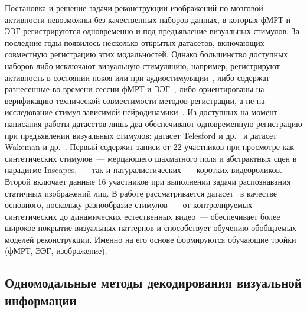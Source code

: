 Постановка и решение задачи реконструкции изображений по мозговой активности невозможны без качественных наборов данных, в которых фМРТ и ЭЭГ регистрируются одновременно и под предъявление визуальных стимулов. За последние годы появилось несколько открытых датасетов, включающих совместную регистрацию этих модальностей. Однако большинство доступных наборов либо исключают визуальную стимуляцию, например, регистрируют активность в состоянии покоя или при аудиостимуляции~\cite{Gu2023, Momenian2024}, либо содержат разнесенные во времени сессии фМРТ и ЭЭГ~\cite{Berezutskaya2022}, либо ориентированы на верификацию технической совместимости методов регистрации, а не на исследование стимул-зависимой нейродинамики~\cite{GallegoRudolf2023}. Из доступных на момент написания работы датасетов лишь два обеспечивают одновременную регистрацию при предъявлении визуальных стимулов: датасет Telesford и др.~\cite{Telesford2023} и датасет Wakeman и др.~\cite{Wakeman2015}. Первый содержит записи от 22 участников при просмотре как синтетических стимулов~--- мерцающего шахматного поля и абстрактных сцен в парадигме Inscapes,~--- так и натуралистических~--- коротких видеороликов. Второй включает данные 16 участников при выполнении задачи распознавания статичных изображений лиц. В работе рассматривается датасет~\cite{Telesford2023} в качестве основного, поскольку разнообразие стимулов~--- от контролируемых синтетических до динамических естественных видео~--- обеспечивает более широкое покрытие визуальных паттернов и способствует обучению обобщаемых моделей реконструкции. Именно на его основе формируются обучающие тройки (фМРТ, ЭЭГ, изображение).

\subsection{Одномодальные методы декодирования визуальной информации}\label{sec1:single}

